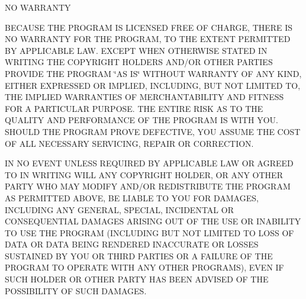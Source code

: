 N\-O W\-A\-R\-R\-A\-N\-T\-Y
\begin{DoxyEnumerate}
\item B\-E\-C\-A\-U\-S\-E T\-H\-E P\-R\-O\-G\-R\-A\-M I\-S L\-I\-C\-E\-N\-S\-E\-D F\-R\-E\-E O\-F C\-H\-A\-R\-G\-E, T\-H\-E\-R\-E I\-S N\-O W\-A\-R\-R\-A\-N\-T\-Y F\-O\-R T\-H\-E P\-R\-O\-G\-R\-A\-M, T\-O T\-H\-E E\-X\-T\-E\-N\-T P\-E\-R\-M\-I\-T\-T\-E\-D B\-Y A\-P\-P\-L\-I\-C\-A\-B\-L\-E L\-A\-W. E\-X\-C\-E\-P\-T W\-H\-E\-N O\-T\-H\-E\-R\-W\-I\-S\-E S\-T\-A\-T\-E\-D I\-N W\-R\-I\-T\-I\-N\-G T\-H\-E C\-O\-P\-Y\-R\-I\-G\-H\-T H\-O\-L\-D\-E\-R\-S A\-N\-D/\-O\-R O\-T\-H\-E\-R P\-A\-R\-T\-I\-E\-S P\-R\-O\-V\-I\-D\-E T\-H\-E P\-R\-O\-G\-R\-A\-M \char`\"{}\-A\-S I\-S\char`\"{} W\-I\-T\-H\-O\-U\-T W\-A\-R\-R\-A\-N\-T\-Y O\-F A\-N\-Y K\-I\-N\-D, E\-I\-T\-H\-E\-R E\-X\-P\-R\-E\-S\-S\-E\-D O\-R I\-M\-P\-L\-I\-E\-D, I\-N\-C\-L\-U\-D\-I\-N\-G, B\-U\-T N\-O\-T L\-I\-M\-I\-T\-E\-D T\-O, T\-H\-E I\-M\-P\-L\-I\-E\-D W\-A\-R\-R\-A\-N\-T\-I\-E\-S O\-F M\-E\-R\-C\-H\-A\-N\-T\-A\-B\-I\-L\-I\-T\-Y A\-N\-D F\-I\-T\-N\-E\-S\-S F\-O\-R A P\-A\-R\-T\-I\-C\-U\-L\-A\-R P\-U\-R\-P\-O\-S\-E. T\-H\-E E\-N\-T\-I\-R\-E R\-I\-S\-K A\-S T\-O T\-H\-E Q\-U\-A\-L\-I\-T\-Y A\-N\-D P\-E\-R\-F\-O\-R\-M\-A\-N\-C\-E O\-F T\-H\-E P\-R\-O\-G\-R\-A\-M I\-S W\-I\-T\-H Y\-O\-U. S\-H\-O\-U\-L\-D T\-H\-E P\-R\-O\-G\-R\-A\-M P\-R\-O\-V\-E D\-E\-F\-E\-C\-T\-I\-V\-E, Y\-O\-U A\-S\-S\-U\-M\-E T\-H\-E C\-O\-S\-T O\-F A\-L\-L N\-E\-C\-E\-S\-S\-A\-R\-Y S\-E\-R\-V\-I\-C\-I\-N\-G, R\-E\-P\-A\-I\-R O\-R C\-O\-R\-R\-E\-C\-T\-I\-O\-N.
\item I\-N N\-O E\-V\-E\-N\-T U\-N\-L\-E\-S\-S R\-E\-Q\-U\-I\-R\-E\-D B\-Y A\-P\-P\-L\-I\-C\-A\-B\-L\-E L\-A\-W O\-R A\-G\-R\-E\-E\-D T\-O I\-N W\-R\-I\-T\-I\-N\-G W\-I\-L\-L A\-N\-Y C\-O\-P\-Y\-R\-I\-G\-H\-T H\-O\-L\-D\-E\-R, O\-R A\-N\-Y O\-T\-H\-E\-R P\-A\-R\-T\-Y W\-H\-O M\-A\-Y M\-O\-D\-I\-F\-Y A\-N\-D/\-O\-R R\-E\-D\-I\-S\-T\-R\-I\-B\-U\-T\-E T\-H\-E P\-R\-O\-G\-R\-A\-M A\-S P\-E\-R\-M\-I\-T\-T\-E\-D A\-B\-O\-V\-E, B\-E L\-I\-A\-B\-L\-E T\-O Y\-O\-U F\-O\-R D\-A\-M\-A\-G\-E\-S, I\-N\-C\-L\-U\-D\-I\-N\-G A\-N\-Y G\-E\-N\-E\-R\-A\-L, S\-P\-E\-C\-I\-A\-L, I\-N\-C\-I\-D\-E\-N\-T\-A\-L O\-R C\-O\-N\-S\-E\-Q\-U\-E\-N\-T\-I\-A\-L D\-A\-M\-A\-G\-E\-S A\-R\-I\-S\-I\-N\-G O\-U\-T O\-F T\-H\-E U\-S\-E O\-R I\-N\-A\-B\-I\-L\-I\-T\-Y T\-O U\-S\-E T\-H\-E P\-R\-O\-G\-R\-A\-M (I\-N\-C\-L\-U\-D\-I\-N\-G B\-U\-T N\-O\-T L\-I\-M\-I\-T\-E\-D T\-O L\-O\-S\-S O\-F D\-A\-T\-A O\-R D\-A\-T\-A B\-E\-I\-N\-G R\-E\-N\-D\-E\-R\-E\-D I\-N\-A\-C\-C\-U\-R\-A\-T\-E O\-R L\-O\-S\-S\-E\-S S\-U\-S\-T\-A\-I\-N\-E\-D B\-Y Y\-O\-U O\-R T\-H\-I\-R\-D P\-A\-R\-T\-I\-E\-S O\-R A F\-A\-I\-L\-U\-R\-E O\-F T\-H\-E P\-R\-O\-G\-R\-A\-M T\-O O\-P\-E\-R\-A\-T\-E W\-I\-T\-H A\-N\-Y O\-T\-H\-E\-R P\-R\-O\-G\-R\-A\-M\-S), E\-V\-E\-N I\-F S\-U\-C\-H H\-O\-L\-D\-E\-R O\-R O\-T\-H\-E\-R P\-A\-R\-T\-Y H\-A\-S B\-E\-E\-N A\-D\-V\-I\-S\-E\-D O\-F T\-H\-E P\-O\-S\-S\-I\-B\-I\-L\-I\-T\-Y O\-F S\-U\-C\-H D\-A\-M\-A\-G\-E\-S.
\end{DoxyEnumerate}

